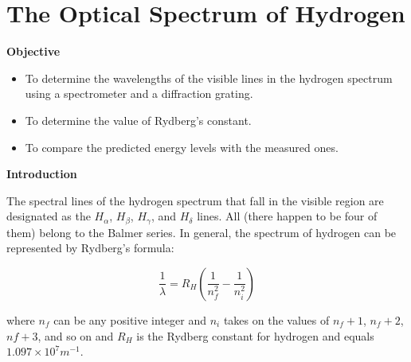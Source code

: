 \section{The Optical Spectrum of Hydrogen}

\makelabheader %

\textbf{Objective}

\begin{itemize}

\item To determine the wavelengths of the visible lines in the hydrogen spectrum using         
a spectrometer and a diffraction grating.

\item To determine the value of Rydberg's constant.

\item To compare the predicted energy levels with the measured ones.

\end{itemize}

\textbf{Introduction}

\bigskip
 
The spectral lines of the hydrogen spectrum that fall in the visible region are designated as 
the $H_\alpha$, 
$H_\beta$, $H_\gamma$, and $H_\delta$  lines.  
All (there happen to be four of them) belong to the Balmer series.  
In general, the spectrum of hydrogen can be represented by Rydberg's formula:

\begin{equation}
\frac{1}{\lambda} = R_H \left ( \frac{1}{n_f^2} - \frac{1}{n_i^2} \right )
\end{equation}

\noindent where $n_f$ can be any positive integer and $n_i$ 
takes on the values of $n_f + 1$, $n_f + 2$, 
$nf + 3$, and so on and $R_H$ is the Rydberg constant 
for hydrogen and equals $1.097 \times 10^7 m^{-1}$.


